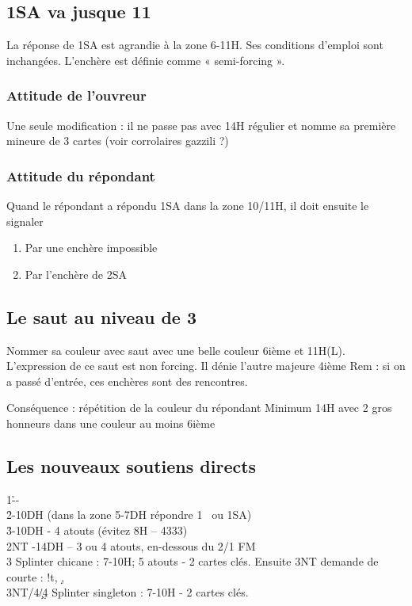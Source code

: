 \documentclass[a4paper]{article}
\begin{document}
\subsection{1SA va jusque 11}

La réponse de 1SA est agrandie à la zone 6-11H. 
Ses conditions d’emploi sont inchangées. 
L’enchère est définie comme « semi-forcing ».

\subsubsection{Attitude de l'ouvreur}

Une seule modification : il ne passe pas avec 14H régulier et nomme sa 
première mineure de 3 cartes (voir corrolaires gazzili ?)

\subsubsection{Attitude du répondant}

Quand le répondant a répondu 1SA dans la zone 10/11H, il doit ensuite 
le signaler

\begin{enumerate}
\item Par une enchère impossible

\item Par l’enchère de 2SA

\end{enumerate}

\subsection{Le saut au niveau de 3}

Nommer sa couleur avec saut avec une belle couleur 6ième et 11H(L). 
L’expression de ce saut est non forcing. Il dénie l’autre majeure 4ième
Rem : si on a passé d’entrée, ces enchères sont des rencontres.

Conséquence : répétition de la couleur du répondant
Minimum 14H avec 2 gros honneurs dans une couleur au moins 6ième

\subsection{Les nouveaux soutiens directs}

\begin{bidtable}
1\h--\\
2\h {}-10DH (dans la zone 5-7DH répondre 1 \s\ ou 1SA)\\
3\h {}-10DH - 4 atouts (évitez 8H – 4333)\\
2NT -14DH – 3 ou 4 atouts, en-dessous du 2/1 FM\\
3\s \> Splinter chicane : 7-10H; 5 atouts - 2 cartes clés. Ensuite 3NT demande de courte : !t, \d , \s \\
3NT/4\c/4\d \> Splinter singleton : 7-10H - 2 cartes clés.
\end{bidtable}
\end{document}
